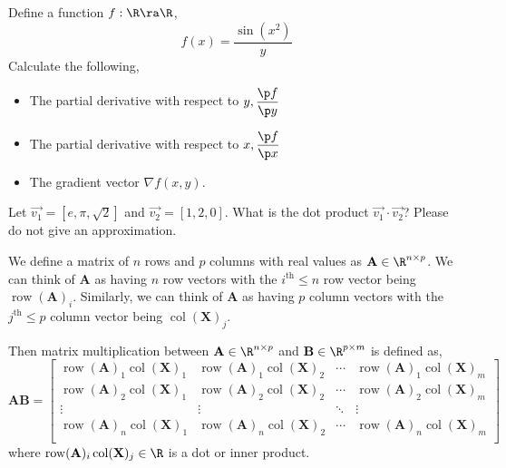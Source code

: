 \documentclass{homework}
\DeclareMathOperator{\row}{row}
\DeclareMathOperator{\col}{col}
\begin{document}

\question Define a function $f:\R\ra\R$,
\[
  f(x) = \frac{\sin(x^2)}{y}
\]
Calculate the following,
\begin{itemize}
  \item The partial derivative with respect to $y, \displaystyle\frac{\p f}{\p y}$
  \item The partial derivative with respect to $x, \displaystyle\frac{\p f}{\p x}$
  \item The gradient vector $\nabla f(x, y)$.
\end{itemize}

\question Let $\vec{v_1} = [e, \pi, \sqrt{2}]$ and $\vec{v_2} = [1, 2, 0]$. What is the dot product $\vec{v_1} \cdot \vec{v_2}$? Please do not give an approximation.

\question We define a matrix of $n$ rows and $p$ columns with real values as $\mathbf{A} \in \R^{n\times p}$. We can think of $\mathbf{A}$ as having $n$ row vectors with the $i^\text{th} \leq n$ row vector being $\row(\mathbf{A})_i$. Similarly, we can think of $\mathbf{A}$ as having $p$ column vectors with the $j^\text{th} \leq p$ column vector being $\col(\mathbf{X})_j$.

Then matrix multiplication between $\mathbf{A} \in \R^{n\times p}$ and $\mathbf{B} \in \R^{p\times m}$ is defined as,
\[
  \mathbf{AB} =
  \begin{bmatrix}
    \row(\mathbf{A})_1\col(\mathbf{X})_1 & \row(\mathbf{A})_1\col(\mathbf{X})_2 & \cdots & \row(\mathbf{A})_1\col(\mathbf{X})_m \\
    \row(\mathbf{A})_2\col(\mathbf{X})_1 & \row(\mathbf{A})_2\col(\mathbf{X})_2 & \cdots & \row(\mathbf{A})_2\col(\mathbf{X})_m \\
    \vdots                               & \vdots                               & \ddots & \vdots                               \\
    \row(\mathbf{A})_n\col(\mathbf{X})_1 & \row(\mathbf{A})_n\col(\mathbf{X})_2 & \cdots & \row(\mathbf{A})_n\col(\mathbf{X})_m \\
  \end{bmatrix}
\]
where $\row(\mathbf{A})_i\col(\mathbf{X})_j \in \R$ is a dot or inner product.
\end{document}
